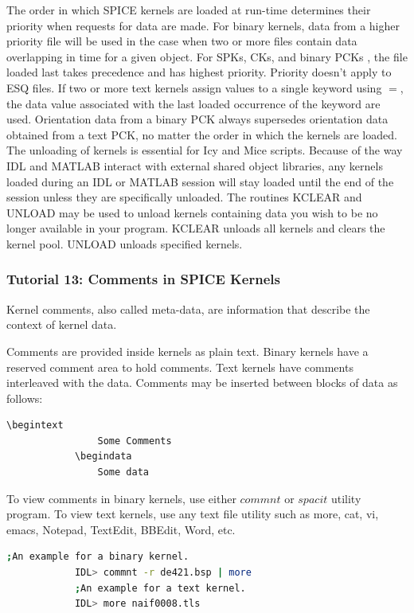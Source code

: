 \documentclass[crop=false,class=book]{standalone}
\begin{document}
            The order in which SPICE kernels are loaded at run-time determines their priority when requests for data are made. For binary kernels, data from a higher priority file will be used in the case when two or more files contain data overlapping in time for a given object. For SPKs, CKs, and binary PCKs , the file loaded last takes precedence and has highest priority. Priority doesn't apply to ESQ files. If two or more text kernels assign values to a single keyword using $=$, the data value associated with the last loaded occurrence of the keyword are used. Orientation data from a binary PCK always supersedes orientation data obtained from a text PCK, no matter the order in which the kernels are loaded. The unloading of kernels is essential for Icy and Mice scripts. Because of the way IDL and MATLAB interact with external shared object libraries, any kernels loaded during an IDL or MATLAB session will stay loaded until the end of the session unless they are specifically unloaded. The routines KCLEAR and UNLOAD may be used to unload kernels containing data you wish to be no longer available in your program. KCLEAR unloads all kernels and clears the kernel pool. UNLOAD unloads specified kernels.
            \subsubsection{Tutorial 13: Comments in SPICE Kernels}
            \begin{definition}
            Kernel comments, also called meta-data, are information that describe the context of kernel data.
            \end{definition}
            Comments are provided inside kernels as plain text. Binary kernels have a reserved comment area to hold comments. Text kernels have comments interleaved with the data. Comments may be inserted between blocks of data as follows:
            \begin{lstlisting}[language=bash,basicstyle=\footnotesize]
            \begintext
            	Some Comments
            \begindata
            	Some data
            \end{lstlisting}
            To view comments in binary kernels, use either $commnt$ or $spacit$ utility program. To view text kernels, use any text file utility such as more, cat, vi, emacs, Notepad, TextEdit, BBEdit, Word, etc.
            \begin{example}
            \begin{lstlisting}[language=bash,basicstyle=\footnotesize]
            ;An example for a binary kernel.
            IDL> commnt -r de421.bsp | more
            ;An example for a text kernel.
            IDL> more naif0008.tls
            \end{lstlisting}
            \end{example}
\end{document}
